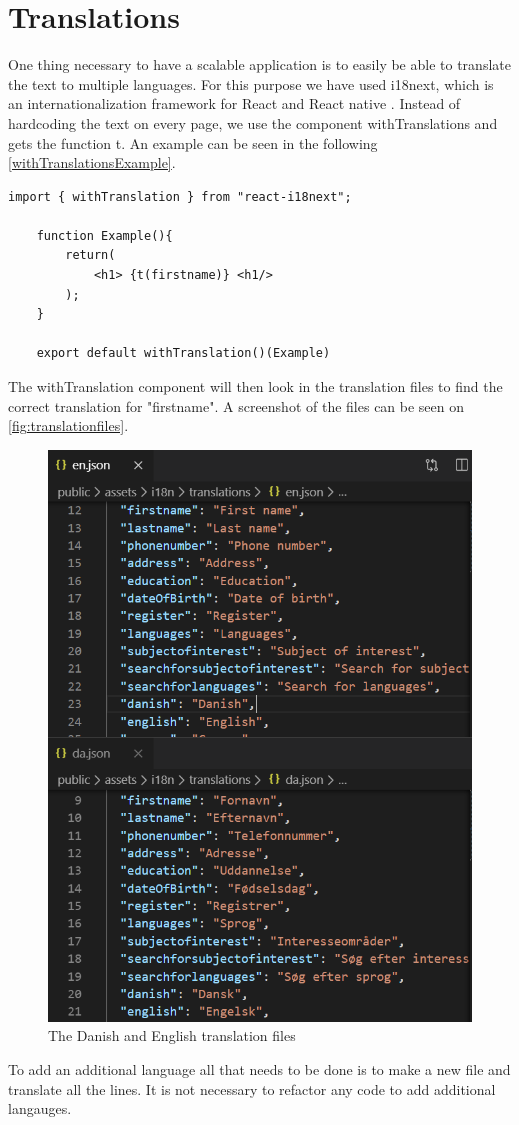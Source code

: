 \section{Translations}
One thing necessary to have a scalable application is to easily be able to translate the text to multiple languages.
For this purpose we have used i18next, which is an internationalization framework for React and React native \cite{react-i18next}.
Instead of hardcoding the text on every page, we use the component withTranslations and gets the function t.  
An example can be seen in the following \autoref{withTranslationsExample}. 

\begin{lstlisting}[caption={Example of withTranslation in use}, captionpos=b, label={withTranslationsExample}]
    import { withTranslation } from "react-i18next";

    function Example(){
        return(
            <h1> {t(firstname)} <h1/>
        );
    }

    export default withTranslation()(Example)
\end{lstlisting}

The withTranslation component will then look in the translation files to find the correct translation for "firstname". 
A screenshot of the files can be seen on \autoref{fig:translationfiles}.
\begin{figure}
    \centering
    \includegraphics[scale=0.5]{figures/translations.PNG}
    \caption{The Danish and English translation files}
    \label{fig:translationfiles}
\end{figure}

To add an additional language all that needs to be done is to make a new file and translate all the lines. 
It is not necessary to refactor any code to add additional langauges.